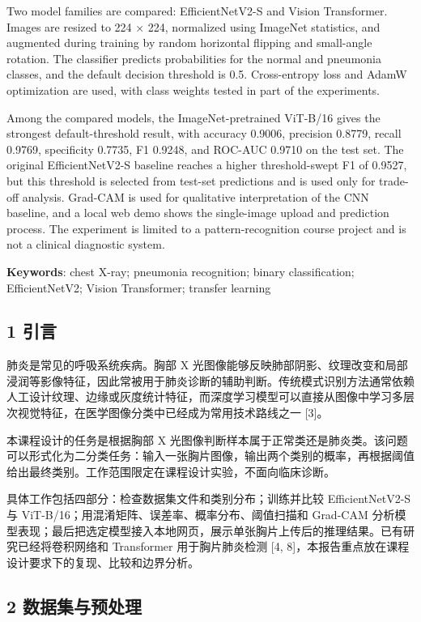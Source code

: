 \documentclass[
]{ctexart}
\begin{document}
Two model families are compared: EfficientNetV2-S and Vision
Transformer. Images are resized to 224 × 224, normalized using ImageNet
statistics, and augmented during training by random horizontal flipping
and small-angle rotation. The classifier predicts probabilities for the
normal and pneumonia classes, and the default decision threshold is 0.5.
Cross-entropy loss and AdamW optimization are used, with class weights
tested in part of the experiments.

Among the compared models, the ImageNet-pretrained ViT-B/16 gives the
strongest default-threshold result, with accuracy 0.9006, precision
0.8779, recall 0.9769, specificity 0.7735, F1 0.9248, and ROC-AUC 0.9710
on the test set. The original EfficientNetV2-S baseline reaches a higher
threshold-swept F1 of 0.9527, but this threshold is selected from
test-set predictions and is used only for trade-off analysis. Grad-CAM
is used for qualitative interpretation of the CNN baseline, and a local
web demo shows the single-image upload and prediction process. The
experiment is limited to a pattern-recognition course project and is not
a clinical diagnostic system.

\textbf{Keywords}: chest X-ray; pneumonia recognition; binary
classification; EfficientNetV2; Vision Transformer; transfer learning

\hypertarget{ux5f15ux8a00}{%
\subsection{1 引言}\label{ux5f15ux8a00}}

肺炎是常见的呼吸系统疾病。胸部 X
光图像能够反映肺部阴影、纹理改变和局部浸润等影像特征，因此常被用于肺炎诊断的辅助判断。传统模式识别方法通常依赖人工设计纹理、边缘或灰度统计特征，而深度学习模型可以直接从图像中学习多层次视觉特征，在医学图像分类中已经成为常用技术路线之一
{[}3{]}。

本课程设计的任务是根据胸部 X
光图像判断样本属于正常类还是肺炎类。该问题可以形式化为二分类任务：输入一张胸片图像，输出两个类别的概率，再根据阈值给出最终类别。工作范围限定在课程设计实验，不面向临床诊断。

具体工作包括四部分：检查数据集文件和类别分布；训练并比较
EfficientNetV2-S 与 ViT-B/16；用混淆矩阵、误差率、概率分布、阈值扫描和
Grad-CAM
分析模型表现；最后把选定模型接入本地网页，展示单张胸片上传后的推理结果。已有研究已经将卷积网络和
Transformer 用于胸片肺炎检测 {[}4,
8{]}，本报告重点放在课程设计要求下的复现、比较和边界分析。

\hypertarget{ux6570ux636eux96c6ux4e0eux9884ux5904ux7406}{%
\subsection{2
数据集与预处理}\label{ux6570ux636eux96c6ux4e0eux9884ux5904ux7406}}
\end{document}
